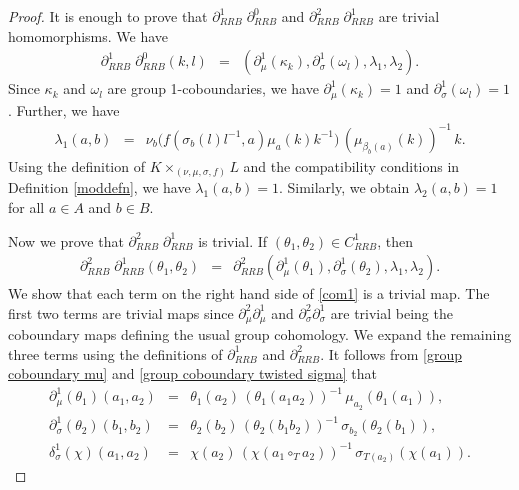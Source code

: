 \documentclass[10pt,a4paper]{amsart}
\begin{document}
\begin{proof}
It is enough to prove that $\partial^1_{RRB}\;  \partial^0_{RRB}$ and $\partial^2_{RRB}\;  \partial^1_{RRB}$ are trivial homomorphisms. We have 
	\begin{eqnarray*}
		\partial^1_{RRB}\;  \partial^0_{RRB}(k,l) &=& (\partial^1_{\mu}(\kappa_k), \partial^1_{\sigma}(\omega_l), \lambda_1, \lambda_2).
	\end{eqnarray*}
	Since $\kappa_k$ and $\omega_l$ are group 1-coboundaries,  we have $\partial^1_{\mu}(\kappa_k)=1$ and $\partial^1_{\sigma}(\omega_l)=1$. Further, we have
	\begin{eqnarray*}
		\lambda_1(a,b) &=& \nu_b \big(f(\sigma_b(l)l^{-1}, a)\mu_a(k)k^{-1} \big)  \,(\mu_{\beta_b(a)}(k))^{-1} \,k.
	\end{eqnarray*}
	Using the definition of $K \times_{(\nu, \mu, \sigma, f)} L$ and the compatibility conditions in Definition \ref{moddefn}, we have $\lambda_1(a, b) = 1$. Similarly, we obtain $\lambda_2(a, b) = 1$ for all $a \in A$ and $b \in B.$ 
		\par 
	
	Now we prove that $\partial^2_{RRB}\;  \partial^1_{RRB}$ is trivial. If $(\theta_1, \theta_2) \in C^1_{RRB}$, then
	\begin{eqnarray}\label{com1}
		\partial^2_{RRB}\;  \partial^1_{RRB}(\theta_1, \theta_2) &=& \partial^2_{RRB}(\partial_{\mu}^1(\theta_1), \partial_{\sigma}^1(\theta_2), \lambda_1, \lambda_2 ).
	\end{eqnarray}
	We show that each term on the right hand side of \eqref{com1} is a trivial map. The first two terms are trivial maps since $\partial_{\mu}^2\partial_{\mu}^1$ and $  \partial_{\sigma}^2\partial_{\sigma}^1$ are trivial being the coboundary maps defining the usual group cohomology. We expand the remaining three terms using the definitions of $\partial^1_{RRB}$ and $\partial^2_{RRB}$. It follows from \eqref{group coboundary mu} and \eqref{group coboundary twisted sigma} that
	\begin{eqnarray*}
		\partial^1_{\mu}(\theta_1)(a_1, a_2) &=& \theta_1(a_2)\, (\theta_1(a_1 a_2))^{-1} \,\mu_{a_2}(\theta_1(a_1)),\\
		\partial^1_{\sigma}(\theta_2)(b_1, b_2) &=& \theta_2(b_2) \,(\theta_2(b_1 b_2))^{-1} \,\sigma_{b_2}(\theta_2(b_1)),\\
		\delta^1_{\sigma}(\chi)(a_1, a_2) &=& \chi(a_2) \, (\chi(a_1 \circ_T a_2))^{-1} \,\sigma_{T(a_2)}( \chi(a_1)).
	\end{eqnarray*}
	

\end{proof}
\end{document}
